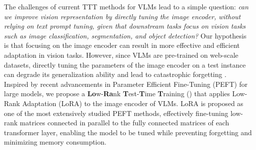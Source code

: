 The challenges of current TTT methods for VLMs lead to a simple question: \textit{can we improve vision representation by directly tuning the image encoder, without relying on text prompt tuning, given that downstream tasks focus on vision tasks such as image classification, segmentation, and object detection?}
Our hypothesis is that focusing on the image encoder can result in more effective and efficient adaptation in vision tasks.
However, since VLMs are pre-trained on web-scale datasets, directly tuning the parameters of the image encoder on a test instance can degrade its generalization ability and lead to catastrophic forgetting \citep{wortsman2022robust,kumar2022fine}.
Inspired by recent advancements in Parameter Efficient Fine-Tuning (PEFT) \citep{han2024parameter, xu2023parameter, ding2023parameter} for large models,
we propose a \textbf{Lo}w-\textbf{Ra}nk \textbf{T}est-\textbf{T}ime \textbf{T}raining (\name) that applies Low-Rank Adaptation (LoRA) \citep{hu2021lora} to the image encoder of VLMs.
LoRA is proposed as one of the most extensively studied PEFT methods, effectively fine-tuning low-rank matrices connected in parallel to the fully connected matrices of each transformer layer, enabling the model to be tuned while preventing forgetting and minimizing memory consumption.

